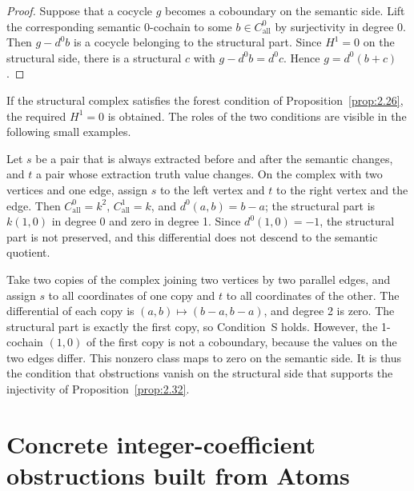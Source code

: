 \begin{proof}

Suppose that a cocycle $g$ becomes a coboundary on the semantic side. Lift the
corresponding semantic 0-cochain to some $b\in C^0_{\mathrm{all}}$ by surjectivity in
degree 0. Then $g-d^0b$ is a cocycle belonging to the structural part. Since $H^1=0$ on
the structural side, there is a structural $c$ with $g-d^0b=d^0c$. Hence $g=d^0(b+c)$.

\end{proof}

If the structural complex satisfies the forest condition of Proposition~\ref{prop:2.26},
the required $H^1=0$ is obtained. The roles of the two conditions are visible in the
following small examples.

\begin{example}\label{ex:2.33}

Let $s$ be a pair that is always extracted before and after the semantic changes, and $t$
a pair whose extraction truth value changes. On the complex with two vertices and one
edge, assign $s$ to the left vertex and $t$ to the right vertex and the edge. Then
$C^0_{\mathrm{all}}=k^2$, $C^1_{\mathrm{all}}=k$, and $d^0(a,b)=b-a$; the structural part
is $k(1,0)$ in degree 0 and zero in degree 1. Since $d^0(1,0)=-1$, the structural
part is not preserved, and this differential does not descend to the semantic quotient.

\end{example}

\begin{example}\label{ex:2.34}

Take two copies of the complex joining two vertices by two parallel edges, and assign $s$
to all coordinates of one copy and $t$ to all coordinates of the other. The differential
of each copy is $(a,b)\mapsto(b-a,b-a)$, and degree 2 is zero. The structural part is
exactly the first copy, so Condition~S holds. However, the 1-cochain $(1,0)$ of the
first copy is not a coboundary, because the values on the two edges differ. This nonzero
class maps to zero on the semantic side. It is thus the condition that obstructions
vanish on the structural side that supports the injectivity of
Proposition~\ref{prop:2.32}.

\end{example}

\section{Concrete integer-coefficient obstructions built from Atoms}\label{sec:2.8}

